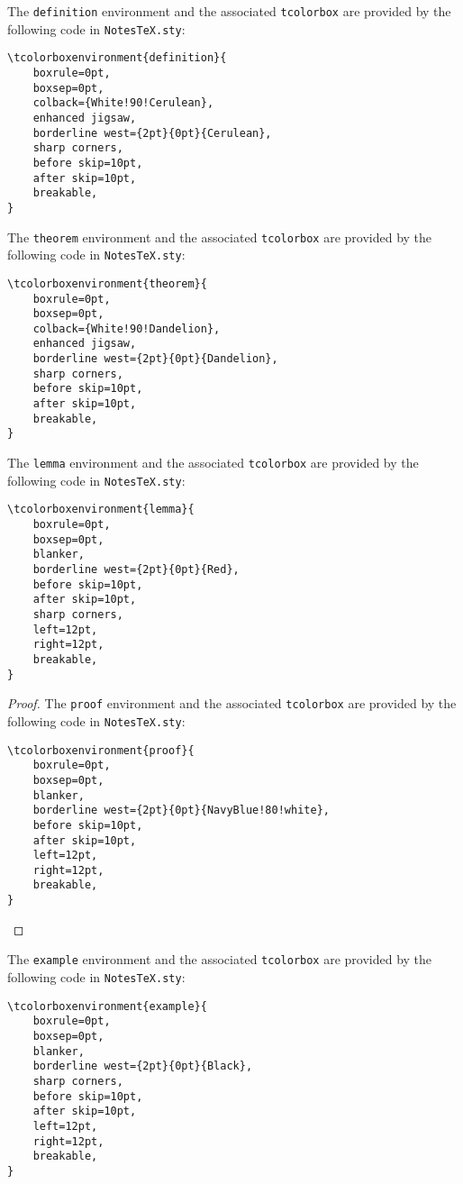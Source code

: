 \documentclass[10pt]{article}
\begin{document}
	\begin{definition}
		The \texttt{definition} environment and the associated \texttt{tcolorbox} are provided by the following code in \texttt{NotesTeX.sty}:
		\begin{lstlisting}[language={[LaTeX]TeX}]
\tcolorboxenvironment{definition}{
	boxrule=0pt,
	boxsep=0pt,
	colback={White!90!Cerulean},
	enhanced jigsaw,
	borderline west={2pt}{0pt}{Cerulean},
	sharp corners,
	before skip=10pt,
	after skip=10pt,
	breakable,
}
		\end{lstlisting}
	\end{definition}
	\begin{theorem}
		The \texttt{theorem} environment and the associated \texttt{tcolorbox} are provided by the following code in \texttt{NotesTeX.sty}:
		\begin{lstlisting}
\tcolorboxenvironment{theorem}{
	boxrule=0pt,
	boxsep=0pt,
	colback={White!90!Dandelion},
	enhanced jigsaw,
	borderline west={2pt}{0pt}{Dandelion},
	sharp corners,
	before skip=10pt,
	after skip=10pt,
	breakable,
}
		\end{lstlisting}
	\end{theorem}
	\begin{lemma}
		The \texttt{lemma} environment and the associated \texttt{tcolorbox} are provided by the following code in \texttt{NotesTeX.sty}:
		\begin{lstlisting}
\tcolorboxenvironment{lemma}{
	boxrule=0pt,
	boxsep=0pt,
	blanker,
	borderline west={2pt}{0pt}{Red},
	before skip=10pt,
	after skip=10pt,
	sharp corners,
	left=12pt,
	right=12pt,
	breakable,
}
		\end{lstlisting}
	\end{lemma}
	\begin{proof}
		The \texttt{proof} environment and the associated \texttt{tcolorbox} are provided by the following code in \texttt{NotesTeX.sty}:
		\begin{lstlisting}
\tcolorboxenvironment{proof}{
	boxrule=0pt,
	boxsep=0pt,
	blanker,
	borderline west={2pt}{0pt}{NavyBlue!80!white},
	before skip=10pt,
	after skip=10pt,
	left=12pt,
	right=12pt,
	breakable,
}
		\end{lstlisting}
	\end{proof}
	\begin{example}
		The \texttt{example} environment and the associated \texttt{tcolorbox} are provided by the following code in \texttt{NotesTeX.sty}:
		\begin{lstlisting}
\tcolorboxenvironment{example}{
	boxrule=0pt,
	boxsep=0pt,
	blanker,
	borderline west={2pt}{0pt}{Black},
	sharp corners,
	before skip=10pt,
	after skip=10pt,
	left=12pt,
	right=12pt,
	breakable,
}
		\end{lstlisting}
	\end{example}
\end{document}
